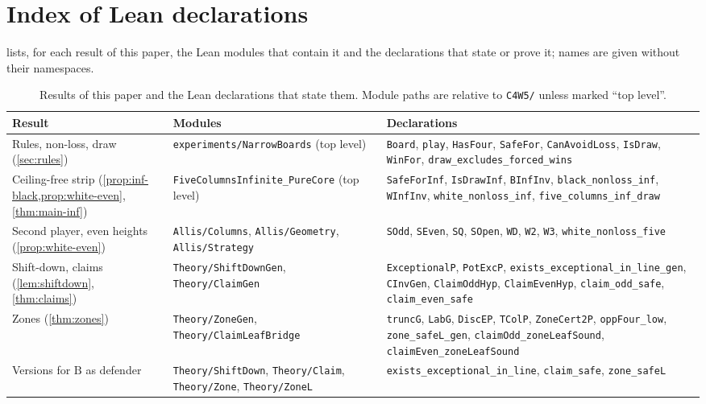 \documentclass[11pt,a4paper]{article}
\renewcommand{\arraystretch}{1.18}
\theoremstyle{plain}
\theoremstyle{definition}
\newcommand{\code}[1]{{\upshape\texttt{\small\nolinkurl{#1}}}}
\newcommand{\B}{\mathrm{B}}
\begin{document}
\clearpage
\section{Index of Lean declarations}
\label{app:index}

 lists, for each result of this paper, the Lean modules that contain it and the declarations that state or prove it; names are given without their namespaces.

\begin{table}[!htbp]
\centering
\caption{Results of this paper and the Lean declarations that state them. Module paths are relative to \code{C4W5/} unless marked ``top level''.}
\label{tab:index}
\scriptsize
\renewcommand{\arraystretch}{1.25}
\begin{tabularx}{\linewidth}{@{}L{3.3cm} L{3.9cm} Y@{}}
\toprule
\textbf{Result} & \textbf{Modules} & \textbf{Declarations} \\
\midrule
Rules, non-loss, draw (\cref{sec:rules}) & \code{experiments/NarrowBoards} (top level) & \code{Board}, \code{play}, \code{HasFour}, \code{SafeFor}, \code{CanAvoidLoss}, \code{IsDraw}, \code{WinFor}, \code{draw_excludes_forced_wins} \\
Ceiling-free strip (\cref{prop:inf-black,prop:white-even}, \cref{thm:main-inf}) & \code{FiveColumnsInfinite_PureCore} (top level) & \code{SafeForInf}, \code{IsDrawInf}, \code{BInfInv}, \code{black_nonloss_inf}, \code{WInfInv}, \code{white_nonloss_inf}, \code{five_columns_inf_draw} \\
Second player, even heights (\cref{prop:white-even}) & \code{Allis/Columns}, \code{Allis/Geometry}, \code{Allis/Strategy} & \code{SOdd}, \code{SEven}, \code{SQ}, \code{SOpen}, \code{WD}, \code{W2}, \code{W3}, \code{white_nonloss_five} \\
Shift-down, claims (\cref{lem:shiftdown}, \cref{thm:claims}) & \code{Theory/ShiftDownGen}, \code{Theory/ClaimGen} & \code{ExceptionalP}, \code{PotExcP}, \code{exists_exceptional_in_line_gen}, \code{CInvGen}, \code{ClaimOddHyp}, \code{ClaimEvenHyp}, \code{claim_odd_safe}, \code{claim_even_safe} \\
Zones (\cref{thm:zones}) & \code{Theory/ZoneGen}, \code{Theory/ClaimLeafBridge} & \code{truncG}, \code{LabG}, \code{DiscEP}, \code{TColP}, \code{ZoneCert2P}, \code{oppFour_low}, \code{zone_safeL_gen}, \code{claimOdd_zoneLeafSound}, \code{claimEven_zoneLeafSound} \\
Versions for $\B$ as defender & \code{Theory/ShiftDown}, \code{Theory/Claim}, \code{Theory/Zone}, \code{Theory/ZoneL} & \code{exists_exceptional_in_line}, \code{claim_safe}, \code{zone_safeL} \\

\end{tabularx}
\end{table}
\end{document}
